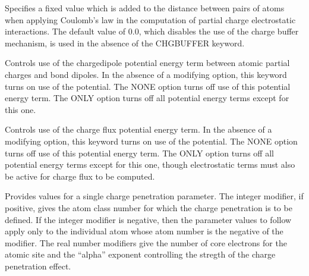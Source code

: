 \documentclass[letterpaper,11pt,english]{sphinxmanual}
\begin{document}
\ignorespaces {}\label{\detokenize{text/keywords:key-chg-buffer}}\begin{description}
\sphinxAtStartPar
Specifies a fixed value which is added to the distance between pairs of atoms when applying Coulomb’s law in the computation of partial charge electrostatic interactions. The default value of 0.0, which disables the use of the charge buffer mechanism, is used in the absence of the CHG\sphinxhyphen{}BUFFER keyword.

\end{description}

\ignorespaces {}\label{\detokenize{text/keywords:key-chgdplterm}}\begin{description}
\sphinxAtStartPar
Controls use of the charge\sphinxhyphen{}dipole potential energy term between atomic partial charges and bond dipoles. In the absence of a modifying option, this keyword turns on use of the potential. The NONE option turns off use of this potential energy term. The ONLY option turns off all potential energy terms except for this one.

\end{description}

\ignorespaces {}\label{\detokenize{text/keywords:key-chgflxterm}}\begin{description}
\sphinxAtStartPar
Controls use of the charge flux potential energy term. In the absence of a modifying option, this keyword turns on use of the potential. The NONE option turns off use of this potential energy term. The ONLY option turns off all potential energy terms except for this one, though electrostatic terms must also be active for charge flux to be computed.

\end{description}

\ignorespaces {}\label{\detokenize{text/keywords:key-chgpen}}\begin{description}
\sphinxAtStartPar
Provides values for a single charge penetration parameter. The integer modifier, if positive, gives the atom class number for which the charge penetration is to be defined. If the integer modifier is negative, then the parameter values to follow apply only to the individual atom whose atom number is the negative of the modifier. The real number modifiers give the number of core electrons for the atomic site and the “alpha” exponent controlling the stregth of the charge penetration effect.

\end{description}
\end{document}
